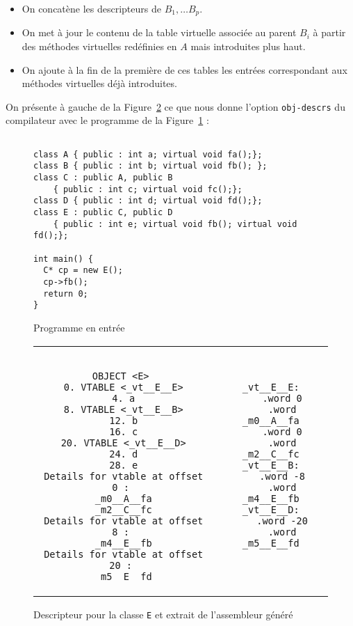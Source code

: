 \documentclass[11pt, a4paper]{article}
\newcommand{\prog}[1]{{\tt#1}}
\begin{document}
\begin{itemize}
\item On concatène les descripteurs de $B_1, \dots B_p$.
\item On met à jour le contenu de la table virtuelle associée au parent $B_i$ à partir des méthodes virtuelles redéfinies en $A$ mais introduites plus haut.
\item On ajoute à la fin de la première de ces tables les entrées correspondant aux méthodes virtuelles déjà introduites.
\end{itemize}
\medskip
On présente à gauche de la Figure~\ref{multidescrs} ce que nous donne l'option \prog{obj-descrs} du compilateur avec le programme de la Figure~\ref{multiprog} :
\medskip
\begin{figure}[h]
\begin{footnotesize}
\begin {lstlisting}[basicstyle=\ttfamily, frame=lines]  %

class A { public : int a; virtual void fa();};
class B { public : int b; virtual void fb(); };
class C : public A, public B 
	{ public : int c; virtual void fc();};
class D { public : int d; virtual void fd();};
class E : public C, public D 
	{ public : int e; virtual void fb(); virtual void fd();};

int main() {
  C* cp = new E();
  cp->fb();
  return 0;
}

\end{lstlisting}
\end{footnotesize}
\caption{Programme en entrée}
\label{multiprog}
\end{figure}

\begin{figure}

\begin{tabular}{cc}

\begin{minipage}{3.5in}
\begin{footnotesize}
\begin{verbatim}

OBJECT <E> 
0. VTABLE <_vt__E__E>
4. a
8. VTABLE <_vt__E__B>
12. b
16. c
20. VTABLE <_vt__E__D>
24. d
28. e
Details for vtable at offset 0 : 
_m0__A__fa
_m2__C__fc
Details for vtable at offset 8 : 
_m4__E__fb
Details for vtable at offset 20 : 
_m5__E__fd

\end{verbatim}
\end{footnotesize}
\end{minipage}


&
\begin{minipage}{3in}
\begin{verbatim}
_vt__E__E:
	.word 0
	.word _m0__A__fa
	.word 0
	.word _m2__C__fc
_vt__E__B:
	.word -8
	.word _m4__E__fb
_vt__E__D:
	.word -20
	.word _m5__E__fd
	
\end{verbatim}
\end{minipage}
\end{tabular}



\caption{Descripteur pour la classe \prog{E} et extrait de l'assembleur généré}
\label{multidescrs}
\end{figure}
\end{document}
